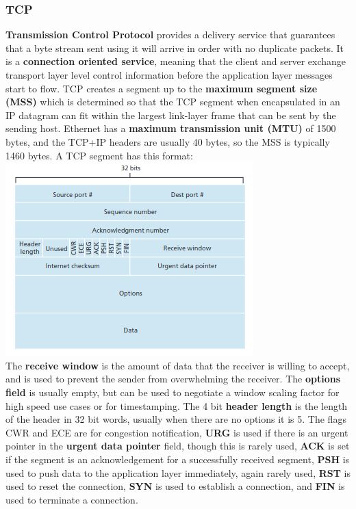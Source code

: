 \subsubsection{TCP}
\textbf{Transmission Control Protocol} provides a delivery service that guarantees that a byte stream sent using it will arrive in order with no duplicate packets. It is a \textbf{connection oriented service}, meaning that the client and server exchange transport layer level control information before the application layer messages start to flow. TCP creates a segment up to the \textbf{maximum segment size (MSS)} which is determined so that the TCP segment when encapsulated in an IP datagram can fit within the largest link-layer frame that can be sent by the sending host. Ethernet has a \textbf{maximum transmission unit (MTU)} of 1500 bytes, and the TCP+IP headers are usually 40 bytes, so the MSS is typically 1460 bytes. A TCP segment has this format:
\includegraphics[width=\linewidth]{../images/w5n2tcpSegmentStructure.png}\\
The \textbf{receive window} is the amount of data that the receiver is willing to accept, and is used to prevent the sender from overwhelming the receiver. The \textbf{options field} is usually empty, but can be used to negotiate a window scaling factor for high speed use cases or for timestamping. The 4 bit \textbf{header length} is the length of the header in 32 bit words, usually when there are no options it is 5. The flags CWR and ECE are for congestion notification, \textbf{URG} is used if there is an urgent pointer in the \textbf{urgent data pointer} field, though this is rarely used, \textbf{ACK} is set if the segment is an acknowledgement for a successfully received segment, \textbf{PSH} is used to push data to the application layer immediately, again rarely used, \textbf{RST} is used to reset the connection, \textbf{SYN} is used to establish a connection, and \textbf{FIN} is used to terminate a connection.\\
